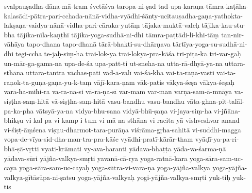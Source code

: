 {{svalpauṣadha-dāna-mā-tram
śvetāśva-taropa-ni-ṣad
tad-upa-karaṇa-tāmra-kaṭāha-kalasādi-pātra-pari-cchada-nānā-vidha-vyādhi-śānty-ucitauṣadha-gaṇa-yathokta-lakṣaṇa-vaidya-nānā-vidha-pari-cāraka-yutāṃ
tājaka-muktā-valeḥ
tājika-kau-stu-bha
tājika-nīla-kaṇṭhī
tājika-yoga-sudhā-ni-dhi
tāmra-paṭṭādi-li-khi-tāṃ
tan-nir-vāhāya
tapo-dhana
tapo-dhanā
tārā-bhakti-su-dhārṇava
tārtīya-yoga-su-sudhā-ni-dhi
tegi-ccha
te-jaḥ-siṃ-ha
trai-lok-ya
trai-lokya-pra-kāśa
tri-piṭa-ka
tri-var-gaḥ
un-mār-ga-gama-na
upa-de-śa
upa-patt-ti
ut-sneha-na
utta-rā-dhyā-ya-na
uttara-sthāna
uttara-tantra
vāchas-pati
vād-ā-valī
vai-śā-kha
vai-ta-raṇa-vasti
vai-ta-raṇok-ta-guṇa-gaṇa-yu-k-taṃ
vājī-kara-ṇam
vāk-patis
vākya-śeṣa
vākya-śeṣaḥ
varā-ha-mihi-ra
va-ra-na-si
vā-rā-ṇa-sī
var-mam
var-man
varṇa-sam-ā-mnāya
va-siṣṭha-saṃ-hitā
vā-siṣṭha-saṃ-hitā
vasu-bandhu
vasu-bandhu
vāta-ghna-pit-talāl-pa-ka-pha
vātsyā-ya-na
vidya-bhu-sana
vidyā-bhū-ṣaṇa
vi-jaya-siṃ-ha
vi-jñāna-bhikṣu
vi-kal-pa
vi-kamp-i-tum
vi-mā-na-sthāna
vi-racita-yā
vishveshvar-anand
vi-śiṣṭ-āṃśena
viṣṇu-dharmot-tara-purāṇa
viśrāma-gṛha-sahitā
vi-suddhi-magga
vopa-de-vīya-sid-dha-man-tra-pra-kāśe
vyādhi-pratī-kārār-tham
vyāḍī-ya-pa-ri-bhā-ṣā-vṛtti
vyati-krāmati
vy-ava-haranti
yādava-bhaṭṭa
yāda-va-śarma-ṇā
yādava-sūri
yājña-valkya-smṛti
yavanā-cā-rya
yoga-ratnā-kara
yoga-sāra-sam-uc-caya
yoga-sāra-sam-uc-cayaḥ
yoga-sūtra-vi-vara-ṇa
yoga-yājña-valkya
yoga-yājña-valkya-gītāsūpa-ni-ṣatsu
yoga-yājña-valkyaḥ
yogi-yājña-valkya-smṛti
yuk-tiḥ
yuk-tis
}}
\normalfontlatin %
\endinput
